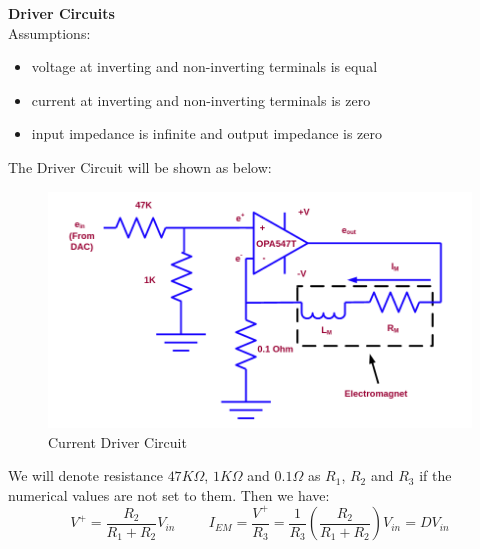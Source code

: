 \documentclass[letterpaper]{article}
\begin{document}
\textbf{\large{Driver Circuits}}\\
Assumptions:
\begin{itemize}
	\item voltage at inverting and non-inverting terminals is equal
	\item current at inverting and non-inverting terminals is zero
	\item input impedance is infinite and output impedance is zero
\end{itemize}
The Driver Circuit will be shown as below:
\begin{figure}[H]
	\centering
	\includegraphics[scale=0.4]{current_driver_circuit.png}
	\caption{Current Driver Circuit}
\end{figure}
We will denote resistance $47K\Omega$, $1K\Omega$ and $0.1\Omega$ as $R_1$, $R_2$ and $R_3$ if the numerical values are not set to them. Then we have:
$$ V^{+}=\frac{R_2}{R_1+R_2}V_{in} \hspace{1cm} I_{EM}=\frac{V^{+}}{R_3}=\frac{1}{R_3}\left(\frac{R_2}{R_1+R_2}\right)V_{in} = DV_{in}$$
\end{document}
